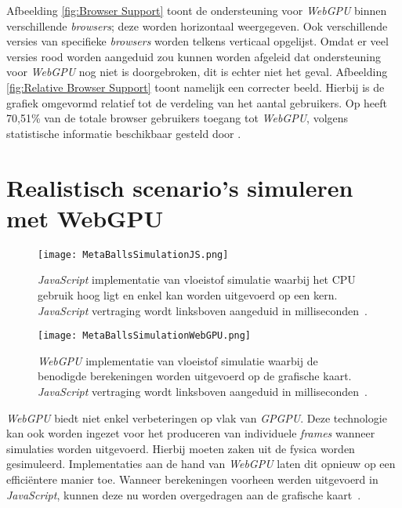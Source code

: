 \bigbreak{}
\date{}

Afbeelding \ref{fig:Browser Support} toont de ondersteuning voor \textit{WebGPU} binnen verschillende \textit{browsers}; deze worden horizontaal weergegeven. Ook verschillende versies van specifieke \textit{browsers} worden telkens verticaal opgelijst. Omdat er veel versies rood worden aangeduid zou kunnen worden afgeleid dat ondersteuning voor \textit{WebGPU} nog niet is doorgebroken, dit is echter niet het geval. Afbeelding \ref{fig:Relative Browser Support} toont namelijk een correcter beeld. Hierbij is de grafiek omgevormd relatief tot de verdeling van het aantal gebruikers. Op   heeft 70,51\% van de totale browser gebruikers toegang tot \textit{WebGPU}, volgens statistische informatie beschikbaar gesteld door \textcite{Deveria2024}.

\section{Realistisch scenario's simuleren met WebGPU}

\begin{figure}
    \texttt{[image: MetaBallsSimulationJS.png]}
    \caption[\textit{JavaScript} implementatie van vloeistof simulatie~\autocite{Jones2024}]{
        \textit{JavaScript} implementatie van vloeistof simulatie waarbij het CPU gebruik hoog ligt en enkel kan worden uitgevoerd op een kern. \textit{JavaScript} vertraging wordt linksboven aangeduid in milliseconden~\autocite{Jones2024}.
    }
    \label{fig:MetaBallsSimulationJS}
\end{figure}

\begin{figure}
    \texttt{[image: MetaBallsSimulationWebGPU.png]}
    \caption[\textit{WebGPU} implementatie van vloeistof simulatie~\autocite{Jones2024}]{
        \textit{WebGPU} implementatie van vloeistof simulatie waarbij de benodigde berekeningen worden uitgevoerd op de grafische kaart. \textit{JavaScript} vertraging wordt linksboven aangeduid in milliseconden~\autocite{Jones2024}.
    }
    \label{fig:MetaBallsSimulationWebGPU}
\end{figure}

\textit{WebGPU} biedt niet enkel verbeteringen op vlak van \textit{GPGPU}. Deze technologie kan ook worden ingezet voor het produceren van individuele \textit{frames} wanneer simulaties worden uitgevoerd. Hierbij moeten zaken uit de fysica worden gesimuleerd. Implementaties aan de hand van \textit{WebGPU} laten dit opnieuw op een efficiëntere manier toe. Wanneer berekeningen voorheen werden uitgevoerd in \textit{JavaScript}, kunnen deze nu worden overgedragen aan de grafische kaart~\autocite{Wallez2023}.

